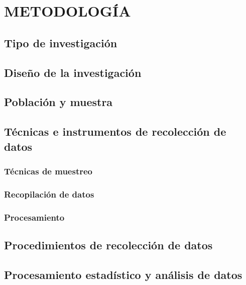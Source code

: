 \documentclass[12pt,a4paper,oneside]{report}
\begin{document}
\chapter{METODOLOGÍA}

\section{Tipo de investigación}

\section{Diseño de la investigación}

\section{Población y muestra}

\section{Técnicas e instrumentos de recolección de datos}

\subsection{Técnicas de muestreo}

\subsection{Recopilación de datos}

\subsection{Procesamiento}

\section{Procedimientos de recolección de datos}

\section{Procesamiento estadístico y análisis de datos}

\end{document}
